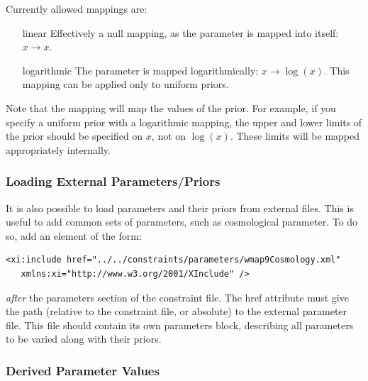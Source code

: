 Currently allowed mappings are:
\begin{itemize}
\item[{\normalfont \ttfamily linear}] Effectively a null mapping, as the parameter is mapped into itself: $x \rightarrow x$.
\item[{\normalfont \ttfamily logarithmic}] The parameter is mapped logarithmically: $x \rightarrow \log(x)$. This mapping can be applied only to uniform priors.
\end{itemize}
Note that the mapping will map the values of the prior. For example, if you specify a uniform prior with a logarithmic mapping, the upper and lower limits of the prior should be specified on $x$, not on $\log(x)$. These limits will be mapped appropriately internally.

\subsubsection{Loading External Parameters/Priors}

It is also possible to load parameters and their priors from external files. This is useful to add common sets of parameters, such as cosmological parameter. To do so, add an element of the form:
\begin{verbatim}
<xi:include href="../../constraints/parameters/wmap9Cosmology.xml" 
   xmlns:xi="http://www.w3.org/2001/XInclude" />
\end{verbatim}
\emph{after} the {\normalfont \ttfamily parameters} section of the constraint file. The {\normalfont \ttfamily href} attribute must give the path (relative to the constraint file, or absolute) to the external parameter file. This file should contain its own {\normalfont \ttfamily parameters} block, describing all parameters to be varied along with their priors. 

\subsubsection{Derived Parameter Values}


